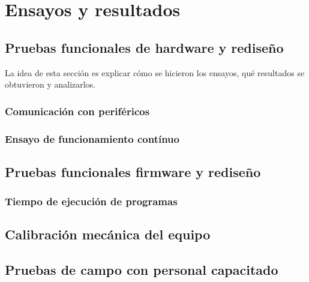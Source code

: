 
\chapter{Ensayos y resultados} %

\label{Chapter4} %


\section{Pruebas funcionales de hardware y rediseño}

La idea de esta sección es explicar cómo se hicieron los ensayos, qué resultados se obtuvieron y analizarlos.
\subsection{Comunicación con periféricos}
\subsection{Ensayo de funcionamiento contínuo}

\section{Pruebas funcionales firmware y rediseño}
\subsection{Tiempo de ejecución de programas}

\section{Calibración mecánica del equipo}

\section{Pruebas de campo con personal capacitado}